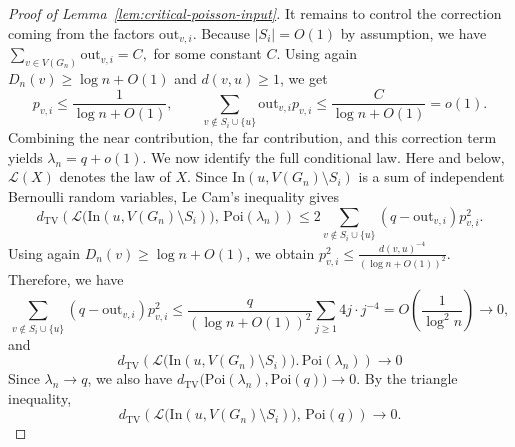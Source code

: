 \documentclass[10pt,a4paper]{amsart}
\begin{document}
\begin{proof}[Proof of Lemma~\ref{lem:critical-poisson-input}]
It remains to control the correction coming from the factors
\(\mathrm{out}_{v,i}\). Because $|S_i| = O(1)$ by assumption, we have
\(
\sum_{v\in V(G_n)} \mathrm{out}_{v,i} = C,
\)
for some constant $C$.
Using again \(D_n(v)\ge \log n+O(1)\) and \(d(v,u)\ge 1\), we get
\[
p_{v,i}\le \frac{1}{\log n+O(1)},
\qquad
\sum_{v\notin S_i\cup\{u\}} \mathrm{out}_{v,i}p_{v,i}
\le \frac{C}{\log n+O(1)}
=o(1).
\]
Combining the near contribution, the far contribution, and this correction term
yields
\(
\lambda_n=q+o(1).
\)
We now identify the full conditional law. Here and below,
\(\mathcal L(X)\) denotes the law of \(X\). Since
\(\mathrm{In}(u,V(G_n)\setminus S_i)\) is a sum of independent Bernoulli random
variables, Le Cam's inequality gives
\[
d_{\mathrm{TV}}\!\left(
\mathcal L\bigl(\mathrm{In}(u,V(G_n)\setminus S_i)\bigr),
\,\mathrm{Poi}(\lambda_n)\right)
\le
2\sum_{v\notin S_i\cup\{u\}} (q-\mathrm{out}_{v,i})p_{v,i}^2.
\]
Using again \(D_n(v)\ge \log n+O(1)\), we obtain
\(
p_{v,i}^2\le \frac{d(v,u)^{-4}}{(\log n+O(1))^2}.
\)
Therefore, we have
\[
\sum_{v\notin S_i\cup\{u\}} (q-\mathrm{out}_{v,i})p_{v,i}^2
\le
\frac{q}{(\log n+O(1))^2}\sum_{j\ge 1}4j\cdot j^{-4}
=O\!\left(\frac{1}{\log^2 n}\right)\to 0,
\]
and
\[
d_{\mathrm{TV}}\!\left(
\mathcal L\bigl(\mathrm{In}(u,V(G_n)\setminus S_i)\bigr).
\,\mathrm{Poi}(\lambda_n)\right)\to 0
\]
Since \(\lambda_n\to q\), we
also have
\(
d_{\mathrm{TV}}\bigl(\mathrm{Poi}(\lambda_n),\mathrm{Poi}(q)\bigr)\to 0.
\)
By the triangle inequality,
\[
d_{\mathrm{TV}}\!\left(
\mathcal L\bigl(\mathrm{In}(u,V(G_n)\setminus S_i) \bigr),
\,\mathrm{Poi}(q)\right)\to 0.
\]
\end{proof}
\end{document}
